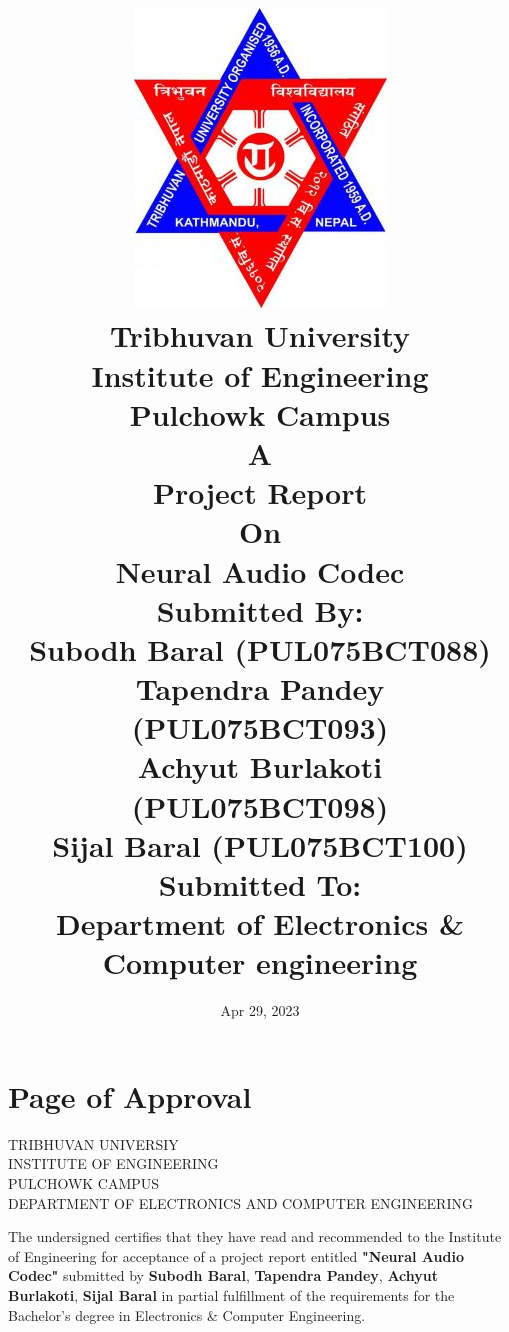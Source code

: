\documentclass[12pt]{report}
\title{
{\includegraphics[scale=.3]{logotu.jpg}}\\
\uppercase\large{
    {Tribhuvan University}\\
    {Institute of Engineering}\\
    {Pulchowk Campus}\\
    \vspace{.5cm}
    {A \\Project Report\\On\\Neural Audio Codec}\\
    \vspace{.5cm}
    {\textbf{Submitted By:}\\Subodh Baral (PUL075BCT088) \\Tapendra Pandey (PUL075BCT093) \\ Achyut Burlakoti (PUL075BCT098)\\Sijal Baral (PUL075BCT100)}\\
    \vspace{.5cm}
    {\textbf{Submitted To:}\\ Department of Electronics \& Computer engineering}\\
                }
    }
\date{Apr 29, 2023} %
\begin{document}
\maketitle
{}
\setcounter{page}{2}
\chapter*{Page of Approval}
\vspace{1.5cm}
\begin{center}
\uppercase{
Tribhuvan Universiy\\
Institute of Engineering\\
Pulchowk Campus\\
Department of Electronics and Computer engineering
    }
    \end{center}
\vspace{.5cm}
The undersigned certifies that they have read and recommended to the Institute of Engineering for acceptance of a project report entitled \textbf{"Neural Audio Codec"} submitted by \textbf{Subodh Baral}, \textbf{Tapendra Pandey}, \textbf{Achyut Burlakoti}, \textbf{Sijal Baral} in partial fulfillment of the requirements for the Bachelor's degree in Electronics \& Computer Engineering.\\
\end{document}
